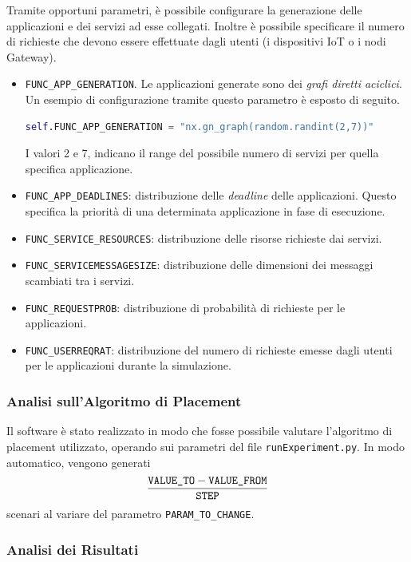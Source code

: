 Tramite opportuni parametri, è possibile configurare la generazione delle applicazioni e dei servizi ad esse collegati. Inoltre è possibile specificare il numero di richieste che devono essere effettuate dagli utenti (i dispositivi IoT o i nodi Gateway). 
\begin{itemize}
	\item \texttt{FUNC\_APP\_GENERATION}. Le applicazioni generate sono dei \textit{grafi diretti aciclici}. Un esempio di configurazione tramite questo parametro è esposto di seguito.
		\begin{lstlisting}[language=python]
self.FUNC_APP_GENERATION = "nx.gn_graph(random.randint(2,7))"\end{lstlisting}
		I valori 2 e 7, indicano il range del possibile numero di servizi per quella specifica applicazione.
	\item \texttt{FUNC\_APP\_DEADLINES}: distribuzione delle \textit{deadline} delle applicazioni. Questo specifica la priorità di una determinata applicazione in fase di esecuzione.
	\item \texttt{FUNC\_SERVICE\_RESOURCES}: distribuzione delle risorse richieste dai servizi.
	\item \texttt{FUNC\_SERVICEMESSAGESIZE}: distribuzione delle dimensioni dei messaggi scambiati tra i servizi.
	\item \texttt{FUNC\_REQUESTPROB}: distribuzione di probabilità di richieste per le applicazioni.
	\item \texttt{FUNC\_USERREQRAT}: distribuzione del numero di richieste emesse dagli utenti per le applicazioni durante la simulazione.
\end{itemize}

\subsubsection{Analisi sull'Algoritmo di Placement}
Il software è stato realizzato in modo che fosse possibile valutare l'algoritmo di placement utilizzato, operando sui parametri del file \texttt{runExperiment.py}. In modo automatico, vengono generati 
		$$\frac{\text{\texttt{VALUE\_TO}} - \text{\texttt{VALUE\_FROM}}}{\text{\texttt{STEP}}}$$
scenari al variare del parametro \texttt{PARAM\_TO\_CHANGE}.

\subsubsection{Analisi dei Risultati}

